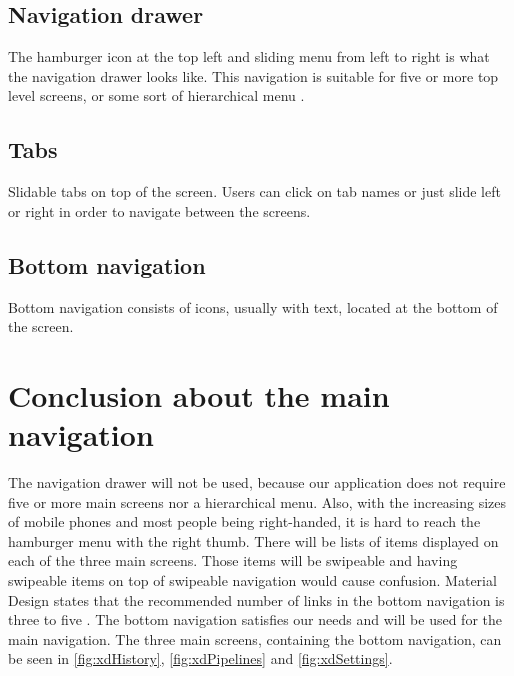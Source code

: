 \subsection{Navigation drawer}
The hamburger icon at the top left and sliding menu from left to right is what the navigation drawer looks like.
This navigation is suitable for five or more top level screens, or some sort of hierarchical menu \cite{navigationdrawer}.

\subsection{Tabs}
Slidable tabs on top of the screen.
Users can click on tab names or just slide left or right in order to navigate between the screens.

\subsection{Bottom navigation}
Bottom navigation consists of icons, usually with text, located at the bottom of the screen.

\section{Conclusion about the main navigation}
The navigation drawer will not be used, because our application does not require five or more main screens nor a hierarchical menu.
Also, with the increasing sizes of mobile phones and most people being right-handed, it is hard to reach the hamburger menu with the right thumb.
There will be lists of items displayed on each of the three main screens.
Those items will be swipeable and having swipeable items on top of swipeable navigation would cause confusion.
Material Design states that the recommended number of links in the bottom navigation is three to five \cite{bottomnavigation}.
The bottom navigation satisfies our needs and will be used for the main navigation.
The three main screens, containing the bottom navigation, can be seen in \autoref{fig:xdHistory}, \autoref{fig:xdPipelines} and \autoref{fig:xdSettings}.

